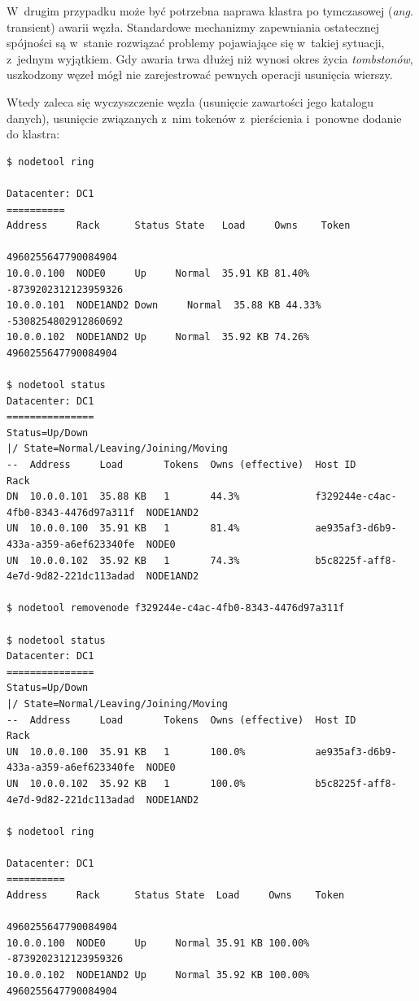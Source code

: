 \documentclass{article} %
\begin{document}
\bigskip

W~drugim przypadku może być potrzebna naprawa klastra po tymczasowej (\emph{ang.} transient) awarii węzła.
Standardowe mechanizmy zapewniania ostatecznej spójności są w~stanie rozwiązać problemy pojawiające się w~takiej sytuacji, z~jednym wyjątkiem.
Gdy awaria trwa dłużej niż wynosi okres życia \emph{tombstonów}, uszkodzony węzeł mógł nie zarejestrować pewnych operacji usunięcia wierszy.

Wtedy zaleca się wyczyszczenie węzła (usunięcie zawartości jego katalogu danych), usunięcie związanych z~nim tokenów z~pierścienia i~ponowne dodanie do klastra:

\pagebreak

\begin{lstlisting}[style=bash, caption={usuwanie węzła z~nieaktualnymi danymi z~klastra}]
$ nodetool ring

Datacenter: DC1
==========
Address     Rack      Status State   Load     Owns    Token
                                                      4960255647790084904
10.0.0.100  NODE0     Up     Normal  35.91 KB 81.40%  -8739202312123959326
10.0.0.101  NODE1AND2 Down     Normal  35.88 KB 44.33%  -5308254802912860692
10.0.0.102  NODE1AND2 Up     Normal  35.92 KB 74.26%  4960255647790084904

$ nodetool status
Datacenter: DC1
===============
Status=Up/Down
|/ State=Normal/Leaving/Joining/Moving
--  Address     Load       Tokens  Owns (effective)  Host ID                               Rack
DN  10.0.0.101  35.88 KB   1       44.3%             f329244e-c4ac-4fb0-8343-4476d97a311f  NODE1AND2
UN  10.0.0.100  35.91 KB   1       81.4%             ae935af3-d6b9-433a-a359-a6ef623340fe  NODE0
UN  10.0.0.102  35.92 KB   1       74.3%             b5c8225f-aff8-4e7d-9d82-221dc113adad  NODE1AND2

$ nodetool removenode f329244e-c4ac-4fb0-8343-4476d97a311f

$ nodetool status
Datacenter: DC1
===============
Status=Up/Down
|/ State=Normal/Leaving/Joining/Moving
--  Address     Load       Tokens  Owns (effective)  Host ID                               Rack
UN  10.0.0.100  35.91 KB   1       100.0%            ae935af3-d6b9-433a-a359-a6ef623340fe  NODE0
UN  10.0.0.102  35.92 KB   1       100.0%            b5c8225f-aff8-4e7d-9d82-221dc113adad  NODE1AND2

$ nodetool ring

Datacenter: DC1
==========
Address     Rack      Status State  Load     Owns    Token
                                                     4960255647790084904
10.0.0.100  NODE0     Up     Normal 35.91 KB 100.00% -8739202312123959326
10.0.0.102  NODE1AND2 Up     Normal 35.92 KB 100.00% 4960255647790084904
\end{lstlisting}
\end{document}
